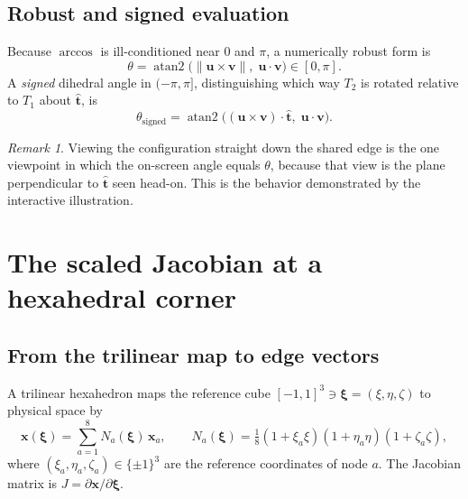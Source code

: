 \documentclass[11pt]{article}
\theoremstyle{definition}
\theoremstyle{remark}
\newtheorem{remark}{Remark}
\newcommand{\vb}[1]{\bm{#1}}
\newcommand{\uv}[1]{\hat{\bm{#1}}}
\begin{document}
\subsection{Robust and signed evaluation}

Because $\arccos$ is ill-conditioned near $0$ and $\pi$, a numerically robust form is
\begin{equation}
  \theta = \operatorname{atan2}\!\big(\|\vb{u}\times\vb{v}\|,\;\vb{u}\cdot\vb{v}\big)\in[0,\pi].
\end{equation}
A \emph{signed} dihedral angle in $(-\pi,\pi]$, distinguishing which way $T_2$ is
rotated relative to $T_1$ about $\uv{t}$, is
\begin{equation}
  \theta_{\text{signed}} = \operatorname{atan2}\!\big((\vb{u}\times\vb{v})\cdot\uv{t},\;\vb{u}\cdot\vb{v}\big).
\end{equation}

\begin{remark}
Viewing the configuration straight down the shared edge is the one viewpoint in which
the on-screen angle equals $\theta$, because that view is the plane perpendicular to
$\uv{t}$ seen head-on. This is the behavior demonstrated by the interactive illustration.
\end{remark}

\section{The scaled Jacobian at a hexahedral corner}

\subsection{From the trilinear map to edge vectors}

A trilinear hexahedron maps the reference cube $[-1,1]^3\ni\bm{\xi}=(\xi,\eta,\zeta)$ to
physical space by
\begin{equation}
  \vb{x}(\bm{\xi}) = \sum_{a=1}^{8} N_a(\bm{\xi})\,\vb{x}_a,\qquad
  N_a(\bm{\xi}) = \tfrac18(1+\xi_a\xi)(1+\eta_a\eta)(1+\zeta_a\zeta),
\end{equation}
where $(\xi_a,\eta_a,\zeta_a)\in\{\pm1\}^3$ are the reference coordinates of node $a$.
The Jacobian matrix is $J=\partial\vb{x}/\partial\bm{\xi}$.
\end{document}
